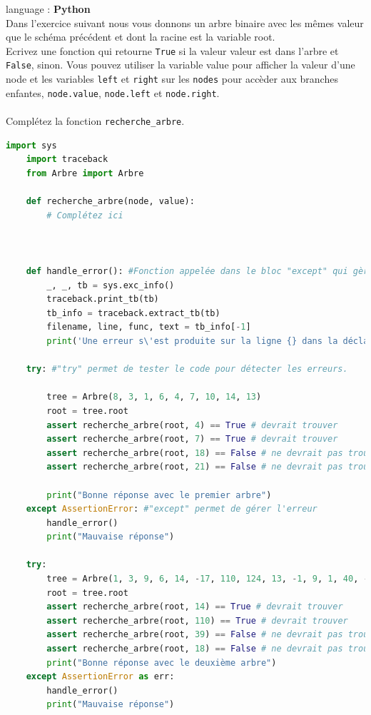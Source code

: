 \begin{Exercice}[15 minutes] language : \textbf{Python}\\
    
    Dans l'exercice suivant nous vous donnons un arbre binaire avec les mêmes valeur que le schéma précédent et dont la racine est la variable root.\\

    Ecrivez une fonction qui retourne \lstinline{True} si la valeur valeur est dans l'arbre et \lstinline{False}, sinon. Vous pouvez utiliser la variable value pour afficher la valeur d'une node et les variables \lstinline{left} et \lstinline{right} sur les \lstinline{nodes} pour accèder aux branches enfantes, \lstinline{node.value}, \lstinline{node.left} et \lstinline{node.right}.\\\\
    Complétez la fonction \lstinline{recherche_arbre}.\\
    \begin{lstlisting}[language=Python]
    import sys
    import traceback
    from Arbre import Arbre
    
    def recherche_arbre(node, value):
        # Complétez ici
        
    
    
    def handle_error(): #Fonction appelée dans le bloc "except" qui gère les erreurs
        _, _, tb = sys.exc_info()
        traceback.print_tb(tb) 
        tb_info = traceback.extract_tb(tb)
        filename, line, func, text = tb_info[-1]
        print('Une erreur s\'est produite sur la ligne {} dans la déclaration {}'.format(line, text))
    
    try: #"try" permet de tester le code pour détecter les erreurs.
    
        tree = Arbre(8, 3, 1, 6, 4, 7, 10, 14, 13)
        root = tree.root
        assert recherche_arbre(root, 4) == True # devrait trouver
        assert recherche_arbre(root, 7) == True # devrait trouver
        assert recherche_arbre(root, 18) == False # ne devrait pas trouver
        assert recherche_arbre(root, 21) == False # ne devrait pas trouver
    
        print("Bonne réponse avec le premier arbre")
    except AssertionError: #"except" permet de gérer l'erreur
        handle_error()
        print("Mauvaise réponse")
        
    try:
        tree = Arbre(1, 3, 9, 6, 14, -17, 110, 124, 13, -1, 9, 1, 40, -98, 120, 23)
        root = tree.root
        assert recherche_arbre(root, 14) == True # devrait trouver
        assert recherche_arbre(root, 110) == True # devrait trouver
        assert recherche_arbre(root, 39) == False # ne devrait pas trouver
        assert recherche_arbre(root, 18) == False # ne devrait pas trouver
        print("Bonne réponse avec le deuxième arbre")
    except AssertionError as err:
        handle_error()
        print("Mauvaise réponse")


\end{lstlisting}
\end{Exercice}
